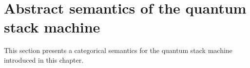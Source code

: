 \section{Abstract semantics of the quantum stack machine}
\label{sec:abstractsemanticsqsm}
This section  presents a categorical semantics for the
quantum stack machine introduced in this chapter.